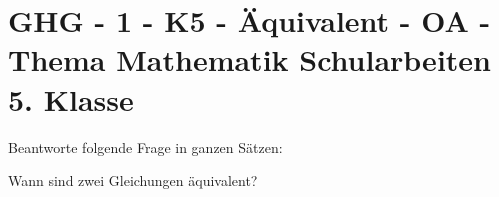 \section{GHG - 1 - K5 - Äquivalent - OA - Thema Mathematik Schularbeiten 5. Klasse}

\begin{beispiel}[GHG]{1}
Beantworte folgende Frage in ganzen Sätzen:

Wann sind zwei Gleichungen äquivalent?

\end{beispiel}